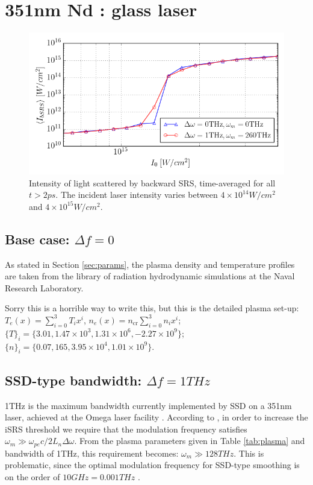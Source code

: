 \section{351nm Nd : glass laser}\label{sec:351}

\begin{figure}[ht]
   \centering
    \includegraphics[width=\columnwidth]{Chapters/C5_broadband/351nm_delw1_delw0.png}
    \caption{Intensity of light scattered by backward SRS, time-averaged for all $t>2\si{ps}$. The incident laser intensity varies between $4\times10^{14}\si{W/cm^2}$ and $4\times10^{15}\si{W/cm^2}$.}
    \label{fig:351nm_base_threshold}
\end{figure}{}


\subsection{Base case: $\Delta f=0$}
As stated in Section \ref{sec:params}, the plasma density and temperature profiles are taken from the library of radiation hydrodynamic simulations at the Naval Research Laboratory. 

Sorry this is a horrible way to write this, but this is the detailed plasma set-up: $T_e(x) = \sum^3_{i=0} T_i x^i$, $n_e(x) = n_{\mathrm{cr}}\sum^3_{i=0} n_i x^i $;
$\{T\}_i  = \{3.01, 1.47\times10^3,1.31\times10^6,-2.27\times10^9\}$;
$\{n\}_i  = \{0.07, 165, 3.95\times10^4, 1.01\times10^9\}$. 



\subsection{SSD-type bandwidth: $\Delta f=1\si{THz}$}
1THz is the maximum bandwidth currently implemented by SSD on a 351nm laser, achieved at the Omega laser facility \citep{Regan2005}. According to \citet{Wen2021}, in order to increase the iSRS threshold we require that the modulation frequency satisfies $\omega_m \gg \omega_{pe} c / 2L_n\Delta\omega$. From the plasma parameters given in Table \ref{tab:plasma} and bandwidth of 1THz, this requirement becomes: $\omega_m \gg 128  \si{THz}$. This is problematic, since the optimal modulation frequency for SSD-type smoothing is on the order of $10 \si{GHz} = 0.001 \si{THz}$ \citep{Regan2005,Kelly2013}.

